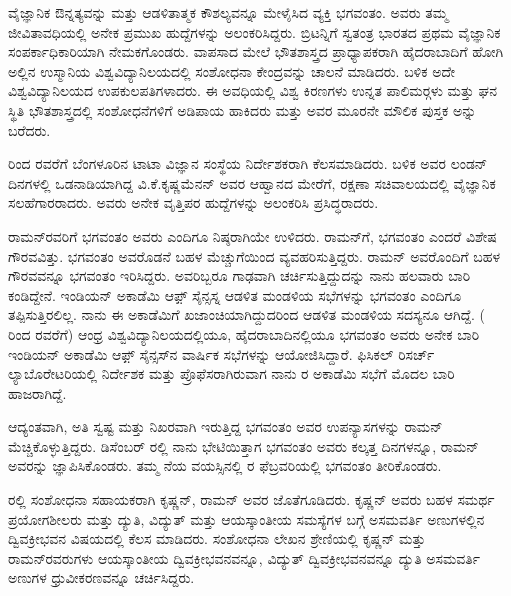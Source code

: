 \vskip 1pt

ವೈಜ್ಞಾನಿಕ ಔನ್ನತ್ಯವನ್ನು ಮತ್ತು ಆಡಳಿತಾತ್ಮಕ ಕೌಶಲ್ಯವನ್ನೂ ಮೇಳೈಸಿದ ವ್ಯಕ್ತಿ ಭಗವಂತಂ. ಅವರು ತಮ್ಮ ಜೀವಿತಾವಧಿಯಲ್ಲಿ ಅನೇಕ ಪ್ರಮುಖ ಹುದ್ದೆಗಳನ್ನು ಅಲಂಕರಿಸಿದ್ದರು. ಬ್ರಿಟನ್ನಿಗೆ ಸ್ವತಂತ್ರ ಭಾರತದ ಪ್ರಥಮ ವೈಜ್ಞಾನಿಕ ಸಂಪರ್ಕಾಧಿಕಾರಿಯಾಗಿ ನೇಮಕಗೊಂಡರು. ವಾಪಸಾದ ಮೇಲೆ ಭೌತಶಾಸ್ತ್ರದ ಪ್ರಾಧ್ಯಾಪಕರಾಗಿ ಹೈದರಾಬಾದಿಗೆ ಹೋಗಿ ಅಲ್ಲಿನ ಉಸ್ಮಾನಿಯ ವಿಶ್ವವಿದ್ಯಾ\-ನಿಲಯದಲ್ಲಿ ಸಂಶೋಧನಾ ಕೇಂದ್ರವನ್ನು ಚಾಲನೆ ಮಾಡಿದರು. ಬಳಿಕ ಅದೇ ವಿಶ್ವವಿದ್ಯಾನಿಲಯದ ಉಪಕುಲಪತಿಗಳಾದರು. ಈ ಅವಧಿಯಲ್ಲಿ ವಿಶ್ವ ಕಿರಣಗಳು ಉನ್ನತ ಪಾಲಿಮರ್‍ಗಳು ಮತ್ತು ಘನ ಸ್ಥಿತಿ ಭೌತಶಾಸ್ತ್ರದಲ್ಲಿ ಸಂಶೋಧನೆಗಳಿಗೆ ಅಡಿಪಾಯ ಹಾಕಿದರು ಮತ್ತು ಅವರ ಮೂರನೇ ಮೌಲಿಕ ಪುಸ್ತಕ \textit{} ಅನ್ನು ಬರೆದರು. 

\vskip 1pt

 ರಿಂದ  ರವರೆಗೆ ಬೆಂಗಳೂರಿನ ಟಾಟಾ ವಿಜ್ಞಾನ ಸಂಸ್ಥೆಯ ನಿರ್ದೇಶಕರಾಗಿ ಕೆಲಸಮಾಡಿದರು. ಬಳಿಕ ಅವರ ಲಂಡನ್ ದಿನಗಳಲ್ಲಿ ಒಡನಾಡಿಯಾಗಿದ್ದ ವಿ.ಕೆ.ಕೃಷ್ಣಮೆನನ್ ಅವರ ಆಹ್ವಾನದ ಮೇರೆಗೆ, ರಕ್ಷಣಾ ಸಚಿವಾಲಯದಲ್ಲಿ ವೈಜ್ಞಾನಿಕ ಸಲಹೆಗಾರರಾದರು. ಅವರು ಅನೇಕ ವೃತ್ತಿಪರ ಹುದ್ದೆಗಳನ್ನು ಅಲಂಕರಿಸಿ ಪ್ರಸಿದ್ಧರಾದರು.

ರಾಮನ್‍ರವರಿಗೆ ಭಗವಂತಂ ಅವರು ಎಂದಿಗೂ ನಿಷ್ಠರಾಗಿಯೇ ಉಳಿದರು. ರಾಮನ್‍ಗೆ, ಭಗವಂತಂ ಎಂದರೆ ವಿಶೇಷ ಗೌರವವಿತ್ತು. ಭಗವಂತಂ ಅವರೊಡನೆ ಬಹಳ ಮೆಚ್ಚುಗೆಯಿಂದ ವ್ಯವಹರಿಸುತ್ತಿದ್ದರು. ರಾಮನ್ ಅವರೊಂದಿಗೆ ಬಹಳ ಗೌರವವನ್ನೂ ಭಗವಂತಂ ಇರಿಸಿದ್ದರು. ಅವರಿಬ್ಬರೂ ಗಾಢವಾಗಿ ಚರ್ಚಿಸುತ್ತಿದ್ದುದನ್ನು ನಾನು ಹಲವಾರು ಬಾರಿ ಕಂಡಿದ್ದೇನೆ. ಇಂಡಿಯನ್ ಅಕಾಡೆಮಿ ಆಫ಼್ ಸೈನ್ಸಸ್ನ ಆಡಳಿತ ಮಂಡಳಿಯ ಸಭೆಗಳನ್ನು ಭಗವಂತಂ ಎಂದಿಗೂ ತಪ್ಪಿಸುತ್ತಿರಲಿಲ್ಲ. ನಾನು ಈ ಅಕಾಡೆಮಿಗೆ ಖಜಾಂಚಿಯಾಗಿದ್ದುದರಿಂದ ಆಡಳಿತ ಮಂಡಳಿಯ ಸದಸ್ಯನೂ ಆಗಿದ್ದೆ. ( ರಿಂದ  ರವರೆಗೆ) ಆಂಧ್ರ ವಿಶ್ವವಿದ್ಯಾನಿಲಯದಲ್ಲಿಯೂ, ಹೈದರಾಬಾದಿನಲ್ಲಿಯೂ ಭಗವಂತಂ ಅವರು ಅನೇಕ ಬಾರಿ ಇಂಡಿಯನ್ ಅಕಾಡೆಮಿ ಆಫ಼್ ಸೈನ್ಸಸ್‍ನ ವಾರ್ಷಿಕ ಸಭೆಗಳನ್ನು ಆಯೋಜಿಸಿದ್ದಾರೆ. ಫಿಸಿಕಲ್ ರಿಸರ್ಚ್ ಲ್ಯಾಬೊರೇಟರಿಯಲ್ಲಿ ನಿರ್ದೇಶಕ ಮತ್ತು ಪ್ರೊಫೆಸರಾಗಿರುವಾಗ ನಾನು ರ ಅಕಾಡೆಮಿ ಸಭೆಗೆ ಮೊದಲ ಬಾರಿ ಹಾಜರಾಗಿದ್ದೆ.

ಆದ್ಯಂತವಾಗಿ, ಅತಿ ಸ್ವಷ್ಟ ಮತ್ತು ನಿಖರವಾಗಿ ಇರುತ್ತಿದ್ದ ಭಗವಂತಂ ಅವರ ಉಪನ್ಯಾಸಗಳನ್ನು ರಾಮನ್ ಮೆಚ್ಚಿಕೊಳ್ಳುತ್ತಿದ್ದರು. ಡಿಸೆಂಬರ್ ರಲ್ಲಿ ನಾನು ಭೇಟಿಯಿತ್ತಾಗ ಭಗವಂತಂ ಅವರು ಕಲ್ಕತ್ತ ದಿನಗಳನ್ನೂ, ರಾಮನ್ ಅವರನ್ನು ಜ್ಞಾಪಿಸಿಕೊಂಡರು. ತಮ್ಮ  ನೆಯ ವಯಸ್ಸಿನಲ್ಲಿ ರ ಫೆಬ್ರವರಿಯಲ್ಲಿ ಭಗವಂತಂ ತೀರಿಕೊಂಡರು.



ರಲ್ಲಿ ಸಂಶೋಧನಾ ಸಹಾಯಕರಾಗಿ ಕೃಷ್ಣನ್, ರಾಮನ್ ಅವರ ಜೊತೆಗೂಡಿದರು. ಕೃಷ್ಣನ್ ಅವರು ಬಹಳ ಸಮರ್ಥ ಪ್ರಯೋಗಶೀಲರು ಮತ್ತು ದ್ಯುತಿ, ವಿದ್ಯುತ್ ಮತ್ತು ಆಯಸ್ಕಾಂತೀಯ ಸಮಸ್ಯೆಗಳ ಬಗ್ಗೆ ಅಸಮವರ್ತಿ ಅಣುಗಳಲ್ಲಿನ ದ್ವಿವಕ್ರೀಭವನ ವಿಷಯದಲ್ಲಿ ಕೆಲಸ ಮಾಡಿದರು. ಸಂಶೋಧನಾ ಲೇಖನ ಶ್ರೇಣಿಯಲ್ಲಿ ಕೃಷ್ಣನ್ ಮತ್ತು ರಾಮನ್‍ರವರುಗಳು ಆಯಸ್ಕಾಂತೀಯ ದ್ವಿವಕ್ರೀಭವನವನ್ನೂ, ವಿದ್ಯುತ್ ದ್ವಿವಕ್ರೀಭವನವನ್ನೂ ದ್ಯುತಿ ಅಸಮವರ್ತಿ ಅಣುಗಳ ಧ್ರುವೀಕರಣ\-ವನ್ನೂ ಚರ್ಚಿಸಿದ್ದರು.

